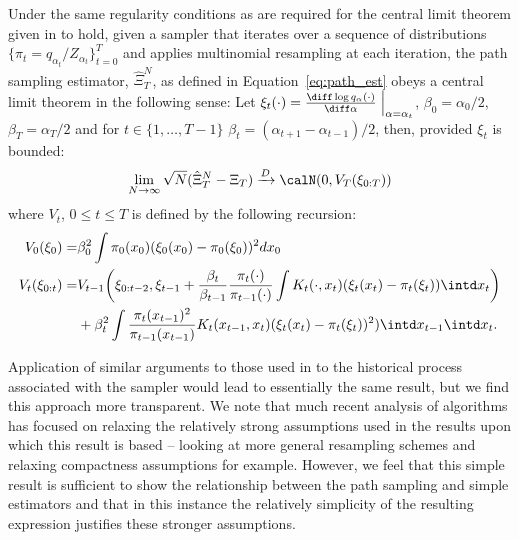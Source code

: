 \begin{proposition}\label{prop:path_clt}
  Under the same regularity conditions as are required for the central limit
  theorem given in \cite{DelMoral:2006hc} to hold, given a \smc sampler that
  iterates over a sequence of distributions $\{\pi_t =
  q_{\alpha_t}/Z_{\alpha_t}\}_{t=0}^T$ and applies multinomial resampling at
  each iteration, the path sampling estimator, $\hat\Xi_{T}^{N}$, as
  defined in Equation~\eqref{eq:path_est} obeys a central limit theorem in the
  following sense: Let $\xi_t(\cdot) = \frac{\diff\log
    q_{\alpha}(\cdot)}{\diff\alpha}\Bigm|_{\alpha = \alpha_t}$, $\beta_{0} =
  \alpha_0 / 2$, $\beta_{T} = \alpha_T / 2$ and for $t \in \{1,\ldots,T-1\}$
  $\beta_t = (\alpha_{t + 1} - \alpha_{t-1})/2$, then, provided $\xi_t$ is
  bounded:
  \begin{equation}
    \lim_{N\to\infty}\sqrt{N}(\hat\Xi_{T}^{N} - \Xi_T)
    \xrightarrow{D}\calN(0, V_T(\xi_{0:T}))
  \end{equation}
  where $V_t$, $0\le t \le T$ is defined by the following recursion:
  \begin{align}
    V_0(\xi_0) =&  \beta_0^2
    \int \pi_0(x_0) (\xi_0(x_0)
    - \pi_0(\xi_0))^2 dx_0 \\
    V_t(\xi_{0:t}) =& V_{t-1}\biggl(\xi_{0:t-2}, \xi_{t-1}
    + \frac{\beta_t}{\beta_{t-1}}
    \frac{\pi_{t}(\cdot)}{\pi_{t-1}(\cdot)}
    \int K_t(\cdot,x_t) (\xi_t(x_t)-\pi_t(\xi_t)) \intd x_t
    \biggr) \\\notag
    &+ \beta_t^2 \int\frac{\pi_t(x_{t-1})^2}{\pi_{t-1}(x_{t-1})}
    K_t(x_{t-1},x_t)(\xi_t(x_t) - \pi_t(\xi_t))^2) \intd x_{t-1} \intd x_t.
  \end{align}


\end{proposition}

Application of similar arguments to those used in \cite{DelMoral:2006hc} to
the historical process associated with the \smc sampler would lead to
essentially the same result, but we find this approach more transparent. We
note that much recent analysis of \smc algorithms has focused on relaxing the
relatively strong assumptions used in the results upon which this result is
based -- looking at more general resampling schemes \cite{DelMoral:2012jq} and
relaxing compactness assumptions \cite{Whiteley:2013} for example. However, we
feel that this simple result is sufficient to show the relationship between
the path sampling and simple estimators and that in this instance the
relatively simplicity of the resulting expression justifies these stronger
assumptions.

